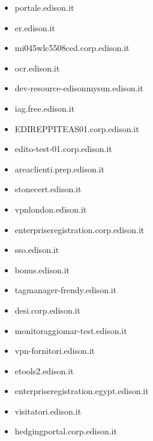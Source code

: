 \documentclass{article}
\begin{document}
\begin{itemize}
        \item portale.edison.it
    
        \item er.edison.it
    
        \item mi045wlc5508ced.corp.edison.it
    
        \item ocr.edison.it
    
        \item dev-resource-edisonmysun.edison.it
    
        \item iag.free.edison.it
    
        \item EDIREPPITEAS01.corp.edison.it
    
        \item edito-test-01.corp.edison.it
    
        \item areaclienti.prep.edison.it
    
        \item stonecert.edison.it
    
        \item vpnlondon.edison.it
    
        \item enterpriseregistration.corp.edison.it
    
        \item sso.edison.it
    
        \item bonus.edison.it
    
        \item tagmanager-frendy.edison.it
    
        \item desi.corp.edison.it
    
        \item monitoraggiomar-test.edison.it
    
        \item vpn-fornitori.edison.it
    
        \item etools2.edison.it
    
        \item enterpriseregistration.egypt.edison.it
    
        \item visitatori.edison.it
    
        \item hedgingportal.corp.edison.it
    

\end{itemize}
\end{document}
